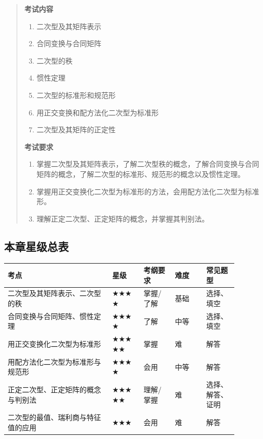 \documentclass[11pt,openany,UTF8]{ctexbook}
\begin{document}
\begin{quote}
\textbf{考试内容}

\begin{enumerate}
\item 二次型及其矩阵表示
\item 合同变换与合同矩阵
\item 二次型的秩
\item 惯性定理
\item 二次型的标准形和规范形
\item 用正交变换和配方法化二次型为标准形
\item 二次型及其矩阵的正定性
\end{enumerate}
\textbf{考试要求}

\begin{enumerate}
\item 掌握二次型及其矩阵表示，了解二次型秩的概念，了解合同变换与合同矩阵的概念，了解二次型的标准形、规范形的概念以及惯性定理。
\item 掌握用正交变换化二次型为标准形的方法，会用配方法化二次型为标准形。
\item 理解正定二次型、正定矩阵的概念，并掌握其判别法。
\end{enumerate}
\end{quote}
\subsection*{本章星级总表}

\begingroup\small\setlength{\tabcolsep}{4.0pt}
\begin{longtable}{@{}L{0.4080\linewidth}L{0.1215\linewidth}L{0.1215\linewidth}L{0.1215\linewidth}L{0.1215\linewidth}@{}}
\toprule
\textbf{考点} & \textbf{星级} & \textbf{考纲要求} & \textbf{难度} & \textbf{常见题型} \\
\midrule
\endhead
二次型及其矩阵表示、二次型的秩 & $\bigstar$$\bigstar$$\bigstar$$\bigstar$ & 掌握/了解 & 基础 & 选择、填空 \\
合同变换与合同矩阵、惯性定理 & $\bigstar$$\bigstar$$\bigstar$$\bigstar$ & 了解 & 中等 & 选择、填空 \\
用正交变换化二次型为标准形 & $\bigstar$$\bigstar$$\bigstar$$\bigstar$$\bigstar$ & 掌握 & 难 & 解答 \\
用配方法化二次型为标准形与规范形 & $\bigstar$$\bigstar$$\bigstar$$\bigstar$ & 会用 & 中等 & 解答 \\
正定二次型、正定矩阵的概念与判别法 & $\bigstar$$\bigstar$$\bigstar$$\bigstar$$\bigstar$ & 理解/掌握 & 难 & 选择、解答、证明 \\
二次型的最值、瑞利商与特征值的应用 & $\bigstar$$\bigstar$$\bigstar$ & 会用 & 难 & 解答 \\
\bottomrule
\end{longtable}
\endgroup
\end{document}
